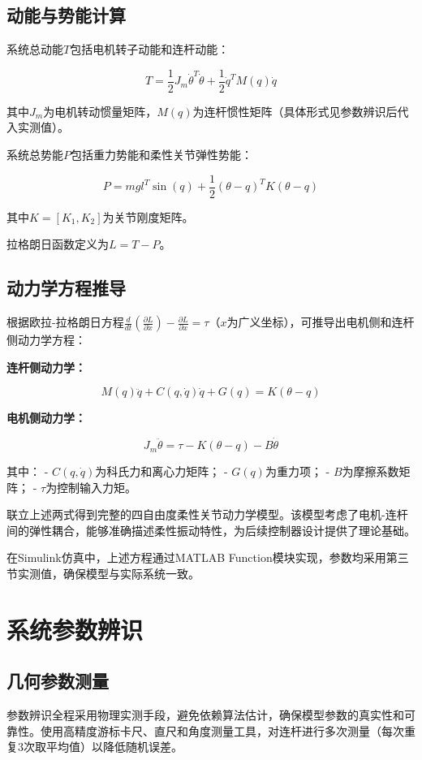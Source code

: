 \documentclass[12pt,hyperref,a4paper,UTF8]{ctexart}
\begin{document}
\subsection{动能与势能计算}

系统总动能$T$包括电机转子动能和连杆动能：

\[
T = \frac{1}{2} J_m \dot{\theta}^T \dot{\theta} + \frac{1}{2} \dot{q}^T M(q) \dot{q}
\]

其中$J_m$为电机转动惯量矩阵，$M(q)$为连杆惯性矩阵（具体形式见参数辨识后代入实测值）。

系统总势能$P$包括重力势能和柔性关节弹性势能：

\[
P = m g l^T \sin(q) + \frac{1}{2} ( \theta - q )^T K ( \theta - q )
\]

其中$K = [K_1, K_2] $为关节刚度矩阵。

拉格朗日函数定义为$L = T - P$。

\subsection{动力学方程推导}

根据欧拉-拉格朗日方程$\frac{d}{dt} \left( \frac{\partial L}{\partial \dot{x}} \right) - \frac{\partial L}{\partial x} = \tau$（$x$为广义坐标），可推导出电机侧和连杆侧动力学方程：

\textbf{连杆侧动力学：}

\[
M(q) \ddot{q} + C(q, \dot{q}) \dot{q} + G(q) = K(\theta - q)
\]

\textbf{电机侧动力学：}

\[
J_m \ddot{\theta} = \tau - K(\theta - q) - B \dot{\theta}
\]

其中：
- $C(q, \dot{q})$为科氏力和离心力矩阵；
- $G(q)$为重力项；
- $B$为摩擦系数矩阵；
- $\tau$为控制输入力矩。

联立上述两式得到完整的四自由度柔性关节动力学模型。该模型考虑了电机-连杆间的弹性耦合，能够准确描述柔性振动特性，为后续控制器设计提供了理论基础。

在Simulink仿真中，上述方程通过MATLAB Function模块实现，参数均采用第三节实测值，确保模型与实际系统一致。

\section{系统参数辨识}

\subsection{几何参数测量}
参数辨识全程采用物理实测手段，避免依赖算法估计，确保模型参数的真实性和可靠性。使用高精度游标卡尺、直尺和角度测量工具，对连杆进行多次测量（每次重复3次取平均值）以降低随机误差。
\end{document}
